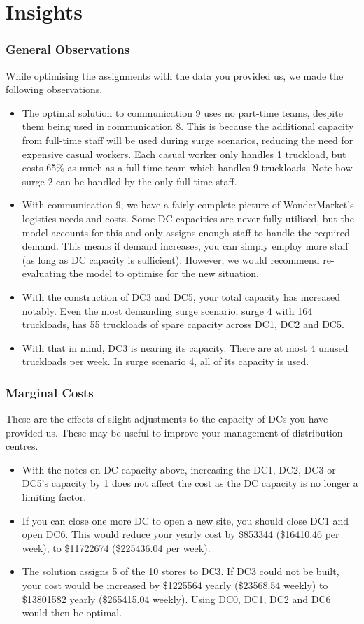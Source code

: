 \documentclass[11pt,a4paper]{article}
\begin{document}
\part{Insights}
\section{General Observations}
While optimising the assignments with the data you provided us, we made 
the following observations.
\begin{itemize}
    \item The optimal solution to communication 9 uses no part-time teams, despite 
    them being used in communication 8. This is because the additional 
    capacity from full-time staff will be used during surge
     scenarios, reducing the need for expensive casual workers. Each casual worker only 
     handles 1 truckload, but costs 65\% as much as a full-time team which handles 
     9 truckloads. Note how 
     surge 2 can be handled by the only full-time staff.
    \item With communication 9, we have a fairly complete picture of WonderMarket's
    logistics needs and costs. Some DC capacities are never fully utilised, 
    but the model accounts for this and only assigns enough staff to handle 
    the required demand. This means if demand increases, you can simply employ more 
    staff (as long as DC capacity is sufficient). However, we would recommend
    re-evaluating the model to optimise for the new situation.
    \item With the construction of DC3 and DC5, your total capacity has increased 
    notably. Even the most demanding surge scenario, surge 4 with 164 truckloads,
    has 55 truckloads of spare capacity across DC1, DC2 and DC5.
    \item With that in mind, DC3 is nearing its capacity. There are at most  
    4 unused truckloads per week. In surge scenario 4, all of its 
    capacity is used. 
\end{itemize}

\section{Marginal Costs}
These are the effects of slight adjustments to the capacity of DCs 
 you have provided us. These may be useful to improve your management of 
 distribution centres. 
\begin{itemize}
    \item With the notes on DC capacity above, increasing the DC1, DC2, DC3 or DC5's
    capacity by 1 does not affect the cost as the DC capacity is no longer a 
    limiting factor.
    \item If you can close one more DC to open a new site, you should close 
    DC1 and open DC6. This would reduce your yearly cost by \$853344 (\$16410.46 per week),
    to \$11722674 (\$225436.04 per week).
    \item The solution assigns 5 of the 10 stores to DC3. If DC3 could not be built, 
    your cost would be increased by \$1225564 yearly (\$23568.54 weekly) 
    to \$13801582 yearly (\$265415.04 weekly). Using DC0, DC1, DC2 and DC6 would 
    then be optimal.
\end{itemize}
\end{document}
